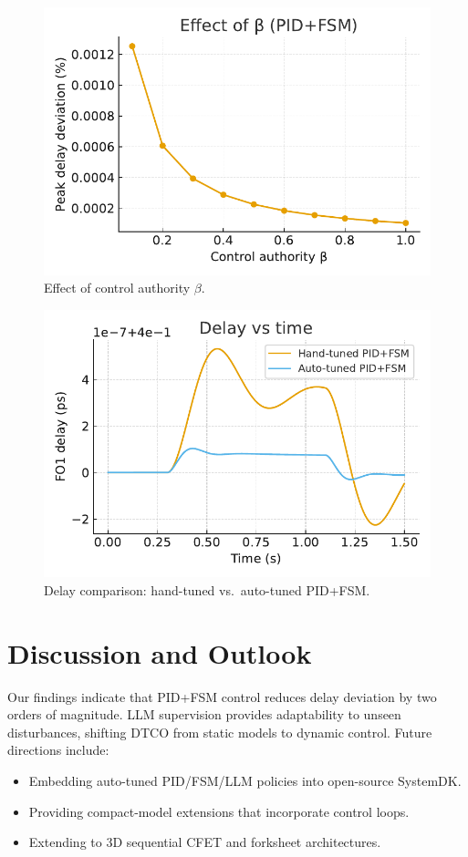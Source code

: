 \documentclass[conference]{IEEEtran}
\begin{document}
\begin{figure}[htbp]
\centering
\includegraphics[width=0.9\columnwidth]{figs/beta_curve.pdf}
\caption{Effect of control authority $\beta$.}
\label{fig:beta}
\end{figure}

\begin{figure}[htbp]
\centering
\includegraphics[width=0.9\columnwidth]{figs/delay_compare.pdf}
\caption{Delay comparison: hand-tuned vs.\ auto-tuned PID+FSM.}
\label{fig:delay}
\end{figure}

\section{Discussion and Outlook}
Our findings indicate that PID+FSM control reduces delay deviation
by two orders of magnitude. LLM supervision provides adaptability to
unseen disturbances, shifting DTCO from static models to dynamic control.
Future directions include:
\begin{itemize}
  \item Embedding auto-tuned PID/FSM/LLM policies into open-source SystemDK.
  \item Providing compact-model extensions that incorporate control loops.
  \item Extending to 3D sequential CFET and forksheet architectures.
\end{itemize}
\end{document}
